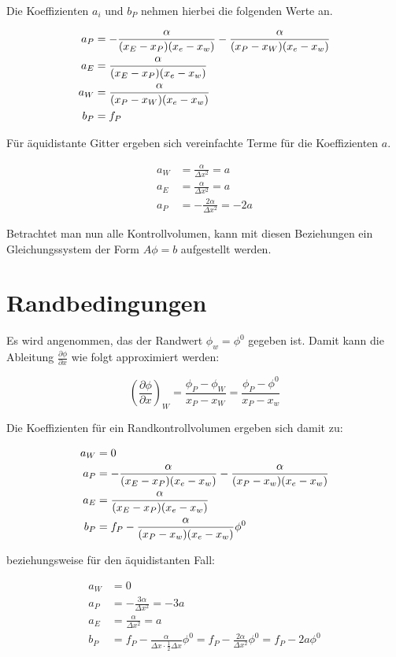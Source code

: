 \documentclass[11pt, ngerman,colorback,accentcolor=tud2d]{tudreport}
\begin{document}
Die Koeffizienten $a_i$ und $b_P$ nehmen hierbei die folgenden Werte an.

\begin{align*}
  a_P &= -\frac{\alpha}{(x_E-x_P) (x_e-x_w)} - \frac{\alpha}{(x_P-x_W) (x_e-x_w)}\\
a_E &= \frac{\alpha}{(x_E-x_P) (x_e-x_w)}\\
a_W &= \frac{\alpha}{(x_P-x_W) (x_e-x_w)}\\
b_P &= f_P
\end{align*}

Für äquidistante Gitter ergeben sich vereinfachte Terme für die Koeffizienten $a$.

\begin{align*}
  a_W &= \frac{\alpha}{\Delta x^2} = a\\
  a_E &= \frac{\alpha}{\Delta x^2} = a\\
  a_P &= - \frac{2 \alpha}{\Delta x^2} = -2a
\end{align*}

Betrachtet man nun alle Kontrollvolumen, kann mit diesen Beziehungen ein 
Gleichungssystem der Form $A\phi = b$ aufgestellt werden.

\section{Randbedingungen}
\label{sec:Randbedingungen}

Es wird angenommen, das der Randwert $\phi_w= \phi^0$ gegeben ist. Damit kann die
Ableitung $\frac{\partial \phi}{\partial x}$ wie folgt approximiert werden:

\begin{equation*}
\left(\frac{\partial \phi}{\partial x}\right)_W = \frac{\phi_P - \phi_W}{x_P - x_W} =
  \frac{\phi_P - \phi^0}{x_P - x_w}
\end{equation*}

Die Koeffizienten für ein Randkontrollvolumen ergeben sich damit zu:

\begin{align*}
  a_W &= 0\\
  a_P &= -\frac{\alpha}{(x_E-x_P) (x_e-x_w)} - \frac{\alpha}{(x_P-x_w) (x_e-x_w)}\\
  a_E &= \frac{\alpha}{(x_E-x_P) (x_e-x_w)}\\
  b_P &= f_P - \frac{\alpha}{(x_P -x_w)(x_e-x_w)}\phi^0
\end{align*}

beziehungsweise für den äquidistanten Fall:

\begin{align*}
  a_W &= 0\\
  a_P &=  -\frac{3 \alpha}{\Delta x^2} = -3a\\
  a_E &= \frac{\alpha}{\Delta x^2} = a\\
  b_P &= f_P - \frac{\alpha}{\Delta x \cdot \frac{1}{2} \Delta x}\phi^0 = f_P - 
  \frac{2\alpha}{\Delta x^2} \phi^0 = f_P - 2a \phi^0
\end{align*}
\end{document}
